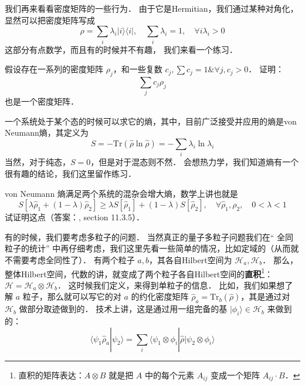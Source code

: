 我们再来看看密度矩阵的一些行为． 由于它是Hermitian，我们通过某种对角化，显然可以把密度矩阵写成
\begin{equation}
\rho = \sum_i\lambda_i|i\rangle\langle i|,\quad \sum_i\lambda_i = 1,\quad \forall i\lambda_i > 0 
\end{equation}
这部分有点数学，而且有的时候并不有趣， 我们来看一个练习．

\begin{exer}{}
假设存在一系列的密度矩阵 $\rho_j$，和一些复数 $c_j, \sum c_j = 1 \& \forall j, c_j>0$． 证明：
\begin{equation}
\sum_j c_j \rho_j 
\end{equation}
也是一个密度矩阵．
\end{exer}{}

一个系统处于某个态的时候可以求它的熵，其中，目前广泛接受并应用的熵是von Neumann熵，其定义为
\begin{equation}
S=-\text{Tr}(\hat\rho\ln\hat\rho)=-\sum_i\lambda_i\ln\lambda_i
\end{equation}
当然，对于纯态，$S=0$，但是对于混态则不然． 会想热力学，我们知道熵有一个很有趣的结论，我们这里留作练习．

\begin{exer}{}
von Neumann 熵满足两个系统的混杂会增大熵，数学上讲也就是
\begin{equation}
S[\lambda\hat\rho_1+(1-\lambda)\hat\rho_2]\ge\lambda S[\hat\rho_1]+(1-\lambda) S[\hat\rho_2],\quad \forall \hat\rho_1,\rho_2,\quad 0<\lambda<1
\end{equation}
试证明这点（答案：\cite{nielsen2010quantum}, section 11.3.5）．
\end{exer}{}

有的时候，我们要考虑多粒子的问题． 当然真正的量子多粒子问题我们在“ 全同粒子的统计” 中再仔细考虑，我们这里先看一些简单的情况，比如定域的（从而就不需要考虑全同性了）． 有两个粒子 $a, b$，其各自Hilbert空间为 $\mathcal{H}_a, \mathcal{H}_b$． 那么，整体Hilbert空间，代数的讲，就变成了两个粒子各自Hilbert空间的{\bf 直积}\footnote{直积的矩阵表达：$A\otimes B$ 就是把 $A$ 中的每个元素 $A_{ij}$ 变成一个矩阵 $A_{ij}\cdot B$．}：$\mathcal{H} = \mathcal{H}_a\otimes \mathcal{H}_b$． 这时候我们定义，来得到单粒子的信息． 比如，我们如果想了解 $a$ 粒子，那么就可以写它的对 $a$ 的约化密度矩阵 $\hat\rho_a=\text{Tr}_b(\hat\rho)$，其是通过对 $\mathcal{H}_b$ 做部分取迹做到的． 技术上讲，这是通过用一组完备的基 $|\phi_i\rangle \in\mathcal{H}_b$ 来做到的：
\begin{equation}
\langle\psi_1\hat\rho_a|\psi_2\rangle=\sum_i\langle\psi_1\otimes\phi_i|\hat\rho|\psi_2\otimes\phi_i\rangle
\end{equation}

